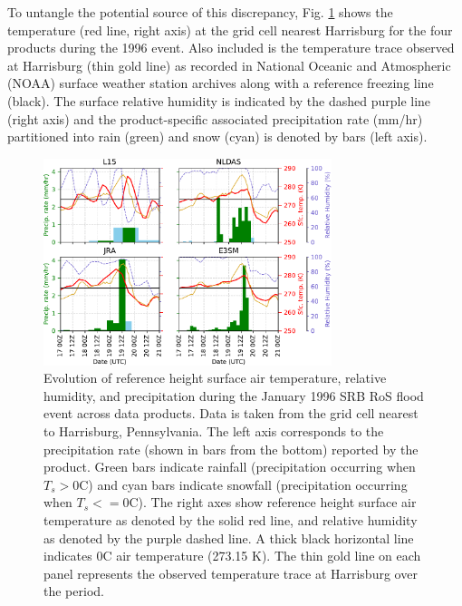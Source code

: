 \documentclass[nhess, manuscript]{copernicus}
\begin{document}
To untangle the potential source of this discrepancy, Fig. \ref{fig:1996eventtrace} shows the temperature (red line, right axis) at the grid cell nearest Harrisburg for the four products during the 1996 event.
Also included is the temperature trace observed at Harrisburg (thin gold line) as recorded in National Oceanic and Atmospheric (NOAA) surface weather station archives along with a reference freezing line (black). The surface relative humidity is indicated by the dashed purple line (right axis) and the product-specific associated precipitation rate (mm/hr) partitioned into rain (green) and snow (cyan) is denoted by bars (left axis).


\begin{figure}
\noindent\includegraphics[width=0.75\textwidth]{figs/cropped/precip_vs_t_1996.pdf}
\caption{Evolution of reference height surface air temperature, relative humidity, and precipitation during the January 1996 SRB RoS flood event across data products. Data is taken from the grid cell nearest to Harrisburg, Pennsylvania. The left axis corresponds to the precipitation rate (shown in bars from the bottom) reported by the product. Green bars indicate rainfall (precipitation occurring when $T_s > 0$\degree{}C) and cyan bars indicate snowfall (precipitation occurring when $T_s <= 0$\degree{}C). The right axes show reference height surface air temperature as denoted by the solid red line, and relative humidity as denoted by the purple dashed line. A thick black horizontal line indicates 0\degree{}C air temperature (273.15 K). The thin gold line on each panel represents the observed temperature trace at Harrisburg over the period.}
\label{fig:1996eventtrace}
\end{figure}
\end{document}
